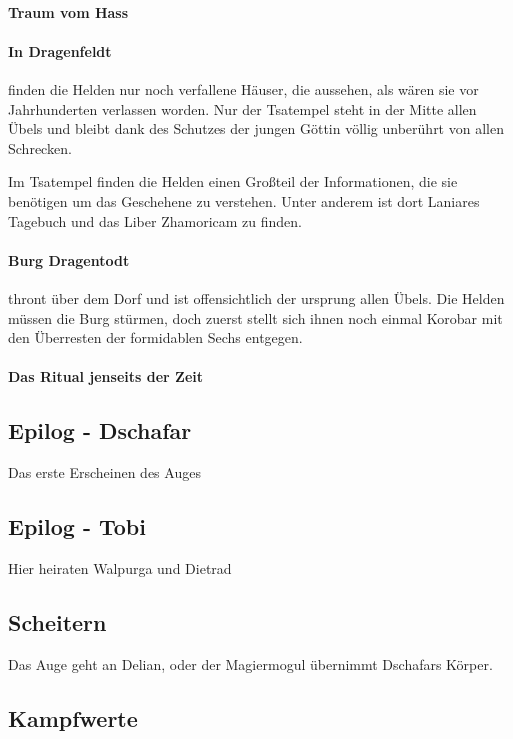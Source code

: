 \paragraph{Traum vom Hass}

\paragraph{In Dragenfeldt} finden die Helden nur noch verfallene Häuser, die aussehen, als wären sie vor Jahrhunderten verlassen worden. Nur der Tsatempel steht in der Mitte allen Übels und bleibt dank des Schutzes der jungen Göttin völlig unberührt von allen Schrecken.

Im Tsatempel finden die Helden einen Großteil der Informationen, die sie benötigen um das Geschehene zu verstehen. Unter anderem ist dort Laniares Tagebuch und das Liber Zhamoricam zu finden.

\paragraph{Burg Dragentodt} thront über dem Dorf und ist offensichtlich der ursprung allen Übels. Die Helden müssen die Burg stürmen, doch zuerst stellt sich ihnen noch einmal Korobar mit den Überresten der formidablen Sechs entgegen.

\paragraph{Das Ritual jenseits der Zeit}

\subsection{Epilog - Dschafar}

Das erste Erscheinen des Auges

\subsection{Epilog - Tobi}

Hier heiraten Walpurga und Dietrad

\subsection{Scheitern}
Das Auge geht an Delian, oder der Magiermogul übernimmt Dschafars Körper.

\subsection{Kampfwerte}

\begin{multicols}{3}
\end{multicols}

